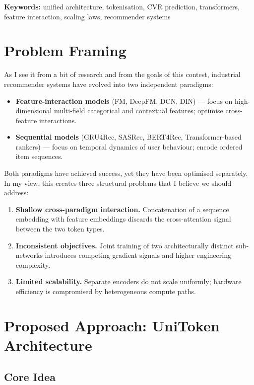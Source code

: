 \documentclass[10pt]{article}
\begin{document}
\noindent\textbf{Keywords:} unified architecture, tokenisation, CVR prediction,
transformers, feature interaction, scaling laws, recommender systems

\newpage

\section{Problem Framing}

As I see it from a bit of research and from the goals of this contest, industrial recommender systems have evolved into two 
independent paradigms:

\begin{itemize}[noitemsep]
    \item \textbf{Feature-interaction models} (FM, DeepFM, DCN, DIN) ---
          focus on high-dimensional multi-field categorical and contextual
          features; optimise cross-feature interactions.
    \item \textbf{Sequential models} (GRU4Rec, SASRec, BERT4Rec,
          Transformer-based rankers) --- focus on temporal dynamics of user
          behaviour; encode ordered item sequences.
\end{itemize}

Both paradigms have achieved  success, yet they
have been optimised separately. In my view, this creates three
structural problems that I believe we should address:

\begin{enumerate}[noitemsep]
    \item \textbf{Shallow cross-paradigm interaction.} Concatenation of a
          sequence embedding with feature embeddings discards the
          cross-attention signal between the two token types.
    \item \textbf{Inconsistent objectives.} Joint training of two
          architecturally distinct sub-networks introduces competing
          gradient signals and higher engineering complexity.
    \item \textbf{Limited scalability.} Separate encoders do not scale
          uniformly; hardware efficiency is compromised by heterogeneous
          compute paths.
\end{enumerate}
\section{Proposed Approach: UniToken Architecture}

\subsection{Core Idea}
\end{document}
